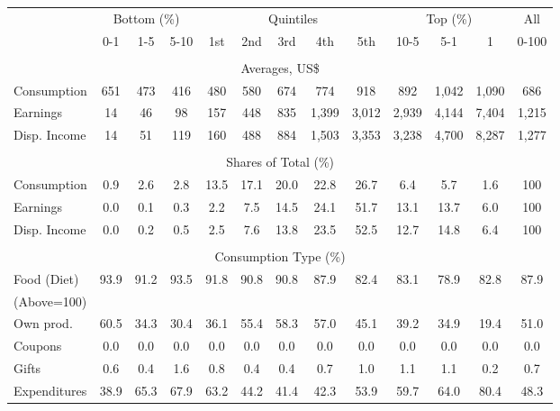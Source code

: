 \begin{tabular}{l c c c| c c c c c| c c c| c}
\toprule
&\multicolumn{3}{c|}{Bottom (\%)} & \multicolumn{5}{c|}{Quintiles} & \multicolumn{3}{c|}{Top (\%)} & All  \\
& 0-1 & 1-5 & 5-10 &  1st & 2nd & 3rd & 4th & 5th & 10-5 & 5-1 & 1 & 0-100 \\
\midrule \\
\multicolumn{13}{c}{Averages, US\$} \\
\midrule
Consumption  & 651  & 473  & 416  & 480  & 580  & 674  & 774  & 918  & 892  & 1,042  & 1,090  & 686 \\
Earnings         & 14 & 46 & 98 & 157 & 448 & 835 & 1,399 & 3,012 & 2,939 & 4,144 & 7,404 & 1,215 \\
Disp. Income & 14 & 51 & 119 & 160 & 488 & 884 & 1,503 & 3,353 & 3,238 & 4,700 & 8,287 & 1,277 \\
\midrule \\
\multicolumn{13}{c}{Shares of Total (\%)} \\
\midrule
Consumption  & 0.9   & 2.6   & 2.8   & 13.5   & 17.1   & 20.0   & 22.8   & 26.7   & 6.4   & 5.7   & 1.6   & 100 \\
Earnings         & 0.0  & 0.1  & 0.3  & 2.2  & 7.5  & 14.5  & 24.1  & 51.7  & 13.1  & 13.7  & 6.0  & 100 \\
Disp. Income & 0.0  & 0.2  & 0.5  & 2.5  & 7.6  & 13.8  & 23.5  & 52.5  & 12.7  & 14.8  & 6.4  & 100 \\
\midrule \\
\multicolumn{13}{c}{Consumption Type (\%)}  \\
\midrule
Food (Diet)  & 93.9 & 91.2 & 93.5 & 91.8 & 90.8 & 90.8 & 87.9 & 82.4 & 83.1 & 78.9 & 82.8 & 87.9 \\
(Above=100) & & & & & & & & & & & &  \\
\hspace{.3cm} Own prod.  & 60.5 & 34.3 & 30.4 & 36.1 & 55.4 & 58.3 & 57.0 & 45.1 & 39.2 & 34.9 & 19.4 & 51.0 \\
\hspace{.3cm} Coupons    & 0.0 & 0.0 & 0.0 & 0.0 & 0.0 & 0.0 & 0.0 & 0.0 & 0.0 & 0.0 & 0.0 & 0.0 \\
\hspace{.3cm} Gifts      & 0.6 & 0.4 & 1.6 & 0.8 & 0.4 & 0.4 & 0.7 & 1.0 & 1.1 & 1.1 & 0.2 & 0.7 \\
\hspace{.3cm} Expenditures  & 38.9 & 65.3 & 67.9 & 63.2 & 44.2 & 41.4 & 42.3 & 53.9 & 59.7 & 64.0 & 80.4 & 48.3 \\

\end{tabular}
